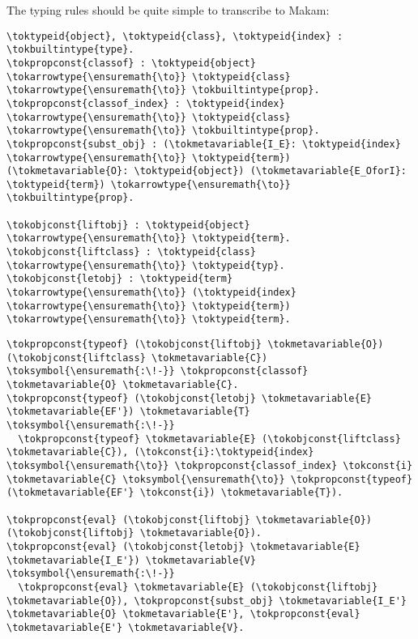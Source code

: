 The typing rules should be quite simple to transcribe to Makam:

\begin{verbatim}
\toktypeid{object}, \toktypeid{class}, \toktypeid{index} : \tokbuiltintype{type}.
\tokpropconst{classof} : \toktypeid{object} \tokarrowtype{\ensuremath{\to}} \toktypeid{class} \tokarrowtype{\ensuremath{\to}} \tokbuiltintype{prop}.
\tokpropconst{classof_index} : \toktypeid{index} \tokarrowtype{\ensuremath{\to}} \toktypeid{class} \tokarrowtype{\ensuremath{\to}} \tokbuiltintype{prop}.
\tokpropconst{subst_obj} : (\tokmetavariable{I_E}: \toktypeid{index} \tokarrowtype{\ensuremath{\to}} \toktypeid{term}) (\tokmetavariable{O}: \toktypeid{object}) (\tokmetavariable{E_OforI}: \toktypeid{term}) \tokarrowtype{\ensuremath{\to}} \tokbuiltintype{prop}.

\tokobjconst{liftobj} : \toktypeid{object} \tokarrowtype{\ensuremath{\to}} \toktypeid{term}. \tokobjconst{liftclass} : \toktypeid{class} \tokarrowtype{\ensuremath{\to}} \toktypeid{typ}.
\tokobjconst{letobj} : \toktypeid{term} \tokarrowtype{\ensuremath{\to}} (\toktypeid{index} \tokarrowtype{\ensuremath{\to}} \toktypeid{term}) \tokarrowtype{\ensuremath{\to}} \toktypeid{term}.
\end{verbatim}

\begin{verbatim}
\tokpropconst{typeof} (\tokobjconst{liftobj} \tokmetavariable{O}) (\tokobjconst{liftclass} \tokmetavariable{C}) \toksymbol{\ensuremath{:\!-}} \tokpropconst{classof} \tokmetavariable{O} \tokmetavariable{C}.
\tokpropconst{typeof} (\tokobjconst{letobj} \tokmetavariable{E} \tokmetavariable{EF'}) \tokmetavariable{T} \toksymbol{\ensuremath{:\!-}}
  \tokpropconst{typeof} \tokmetavariable{E} (\tokobjconst{liftclass} \tokmetavariable{C}), (\tokconst{i}:\toktypeid{index} \toksymbol{\ensuremath{\to}} \tokpropconst{classof_index} \tokconst{i} \tokmetavariable{C} \toksymbol{\ensuremath{\to}} \tokpropconst{typeof} (\tokmetavariable{EF'} \tokconst{i}) \tokmetavariable{T}).

\tokpropconst{eval} (\tokobjconst{liftobj} \tokmetavariable{O}) (\tokobjconst{liftobj} \tokmetavariable{O}).
\tokpropconst{eval} (\tokobjconst{letobj} \tokmetavariable{E} \tokmetavariable{I_E'}) \tokmetavariable{V} \toksymbol{\ensuremath{:\!-}}
  \tokpropconst{eval} \tokmetavariable{E} (\tokobjconst{liftobj} \tokmetavariable{O}), \tokpropconst{subst_obj} \tokmetavariable{I_E'} \tokmetavariable{O} \tokmetavariable{E'}, \tokpropconst{eval} \tokmetavariable{E'} \tokmetavariable{V}.
\end{verbatim}

